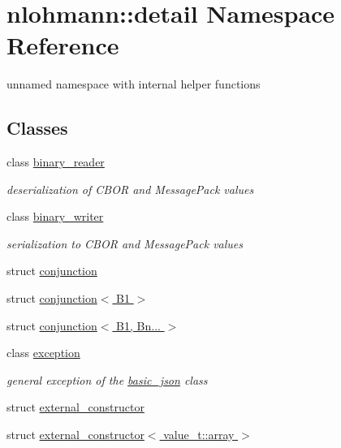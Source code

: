 \hypertarget{namespacenlohmann_1_1detail}{}\section{nlohmann\+:\+:detail Namespace Reference}
\label{namespacenlohmann_1_1detail}


unnamed namespace with internal helper functions  


\subsection*{Classes}
\begin{DoxyCompactItemize}
\item 
class \hyperlink{classnlohmann_1_1detail_1_1binary__reader}{binary\+\_\+reader}
\begin{DoxyCompactList}\small\item\em deserialization of C\+B\+OR and Message\+Pack values \end{DoxyCompactList}\item 
class \hyperlink{classnlohmann_1_1detail_1_1binary__writer}{binary\+\_\+writer}
\begin{DoxyCompactList}\small\item\em serialization to C\+B\+OR and Message\+Pack values \end{DoxyCompactList}\item 
struct \hyperlink{structnlohmann_1_1detail_1_1conjunction}{conjunction}
\item 
struct \hyperlink{structnlohmann_1_1detail_1_1conjunction_3_01B1_01_4}{conjunction$<$ B1 $>$}
\item 
struct \hyperlink{structnlohmann_1_1detail_1_1conjunction_3_01B1_00_01Bn_8_8_8_01_4}{conjunction$<$ B1, Bn... $>$}
\item 
class \hyperlink{classnlohmann_1_1detail_1_1exception}{exception}
\begin{DoxyCompactList}\small\item\em general exception of the \hyperlink{classnlohmann_1_1basic__json}{basic\+\_\+json} class \end{DoxyCompactList}\item 
struct \hyperlink{structnlohmann_1_1detail_1_1external__constructor}{external\+\_\+constructor}
\item 
struct \hyperlink{structnlohmann_1_1detail_1_1external__constructor_3_01value__t_1_1array_01_4}{external\+\_\+constructor$<$ value\+\_\+t\+::array $>$}
\item 

\end{DoxyCompactItemize}
